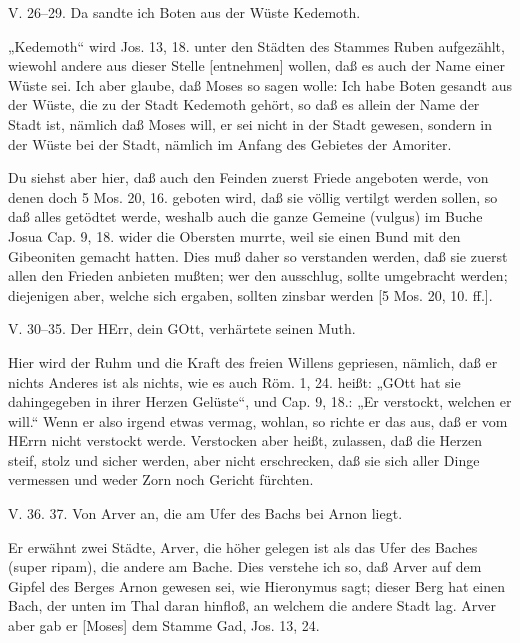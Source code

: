 \begin{schriftzitat}
V. 26–29. Da sandte ich Boten aus der Wüste Kedemoth.
\end{schriftzitat}

„Kedemoth“ wird Jos. 13, 18. unter den Städten des Stammes Ruben aufgezählt, wiewohl andere aus dieser Stelle [entnehmen] wollen, daß es auch der Name einer Wüste sei. Ich aber glaube, daß Moses so sagen wolle: Ich habe Boten gesandt aus der Wüste, die zu der Stadt Kedemoth gehört, so daß es allein der Name der Stadt ist, nämlich daß Moses will, er sei nicht in der Stadt gewesen, sondern in der Wüste bei der Stadt, nämlich im Anfang des Gebietes der Amoriter.

Du siehst aber hier, daß auch den Feinden zuerst Friede angeboten werde, von denen doch 5 Mos. 20, 16. geboten wird, daß sie völlig vertilgt werden sollen, so daß alles getödtet werde, weshalb auch die ganze Gemeine (vulgus) im Buche Josua Cap. 9, 18. wider die Obersten murrte, weil sie einen Bund mit den Gibeoniten gemacht hatten. Dies muß daher so verstanden werden, daß sie zuerst allen den Frieden anbieten mußten; wer den ausschlug, sollte umgebracht werden; diejenigen aber, welche sich ergaben, sollten zinsbar werden [5 Mos. 20, 10. ff.].

\begin{schriftzitat}
V. 30–35. Der HErr, dein GOtt, verhärtete seinen Muth.
\end{schriftzitat}

Hier wird der Ruhm und die Kraft des freien Willens gepriesen, nämlich, daß er nichts Anderes ist als nichts, wie es auch Röm. 1, 24. heißt: „GOtt hat sie dahingegeben in ihrer Herzen Gelüste“, und Cap. 9, 18.: „Er verstockt, welchen er will.“ Wenn er also irgend etwas vermag, wohlan, so richte er das aus, daß er vom HErrn nicht verstockt werde. Verstocken aber heißt, zulassen, daß die Herzen steif, stolz
und sicher werden, aber nicht erschrecken, daß sie sich aller Dinge vermessen und weder Zorn noch Gericht fürchten.

\begin{schriftzitat}
V. 36. 37. Von Arver an, die am Ufer des Bachs bei Arnon liegt.
\end{schriftzitat}

Er erwähnt zwei Städte, Arver, die höher gelegen ist als das Ufer des Baches (super ripam), die andere am Bache. Dies verstehe ich so, daß Arver auf dem Gipfel des Berges Arnon gewesen sei, wie Hieronymus sagt; dieser Berg hat einen Bach, der unten im Thal daran hinfloß, an welchem die andere Stadt lag. Arver aber gab er [Moses] dem Stamme Gad, Jos. 13, 24.

